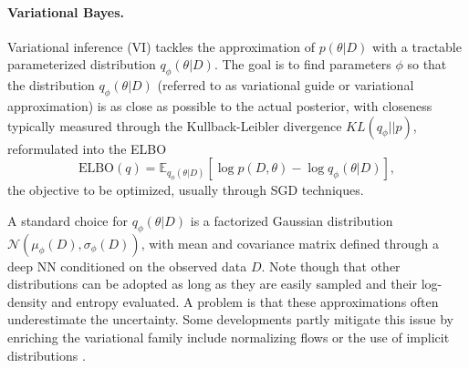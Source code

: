 \paragraph{Variational Bayes.} 

Variational inference (VI) \cite{blei2017variational} tackles the 
 approximation of  $p(\theta | D)$ with a tractable parameterized
 distribution $q_{\phi}(\theta |D)$. The goal is to find parameters $\phi$ so that the distribution 
$q_{\phi}(\theta |D )$  (referred to as variational guide
or variational approximation)  is as close as possible to the actual posterior, with closeness typically measured through 
the Kullback-Leibler 
divergence $KL(q_{\phi } || p)$, reformulated into the ELBO
\begin{equation}\label{eq:elbo}
\mbox{ELBO}(q) = \mathbb{E}_{q_{\phi}(\theta |D)} \left[ \log p(D,\theta ) - \log q_{\phi}(\theta |D)\right],
\end{equation}
the objective to be optimized,
usually through SGD techniques. 

A standard choice
for $q_{\phi}(\theta |D )$ is a factorized Gaussian 
distribution $\mathcal{N}(\mu_{\phi}(D), \sigma_{\phi}(D))$,
with  mean and covariance matrix defined through a
 deep NN conditioned on the observed data $D$.
 Note though that 
other distributions can be adopted as long as they 
 are easily sampled and their log-density and entropy evaluated. 
A problem is that these approximations often 
underestimate the uncertainty. Some developments
partly mitigate this  issue
by  enriching the variational family include normalizing flows \cite{rezende2015variational} or the use of implicit distributions \cite{huszar2017variational}.

